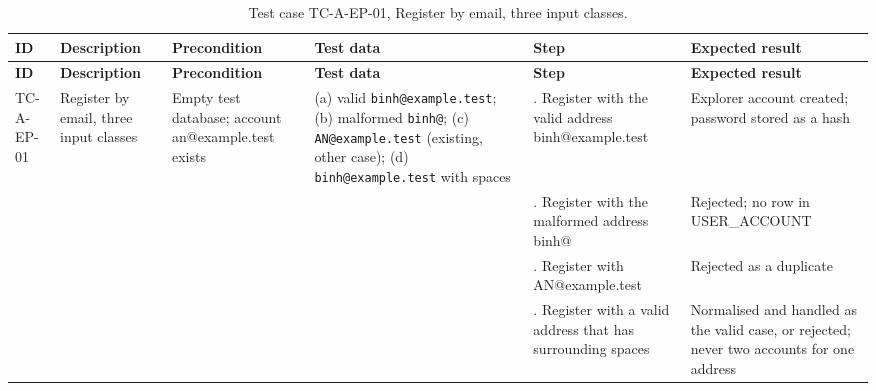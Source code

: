 {\footnotesize{}\renewcommand{\arraystretch}{1.1}
\begin{longtable}{|>{\raggedright\arraybackslash}p{}|>{\raggedright\arraybackslash}p{}|>{\raggedright\arraybackslash}p{}|>{\raggedright\arraybackslash}p{}|>{\raggedright\arraybackslash}p{}|>{\raggedright\arraybackslash}p{}|}
\caption{Test case TC-A-EP-01, Register by email, three input classes.} \\
\hline
\textbf{ID} & \textbf{Description} & \textbf{Precondition} & \textbf{Test data} & \textbf{Step} & \textbf{Expected result} \\ \hline
\endfirsthead
\hline
\textbf{ID} & \textbf{Description} & \textbf{Precondition} & \textbf{Test data} & \textbf{Step} & \textbf{Expected result} \\ \hline
\endhead
TC-A-EP-01 & Register by email, three input classes & Empty test database; account an@\allowbreak{}example.\allowbreak{}test exists & (a) valid \texttt{binh@\allowbreak{}example.\allowbreak{}test}; (b) malformed \texttt{binh@\allowbreak{}}; (c) \texttt{AN@\allowbreak{}example.\allowbreak{}test} (existing, other case); (d) \texttt{binh@\allowbreak{}example.\allowbreak{}test} with spaces & 1. Register with the valid address binh@\allowbreak{}example.\allowbreak{}test & Explorer account created; password stored as a hash \\ \cline{5-6}
 &  &  &  & 2. Register with the malformed address binh@ & Rejected; no row in USER\_\allowbreak{}ACCOUNT \\ \cline{5-6}
 &  &  &  & 3. Register with AN@\allowbreak{}example.\allowbreak{}test & Rejected as a duplicate \\ \cline{5-6}
 &  &  &  & 4. Register with a valid address that has surrounding spaces & Normalised and handled as the valid case, or rejected; never two accounts for one address \\ \hline
\end{longtable}
}

